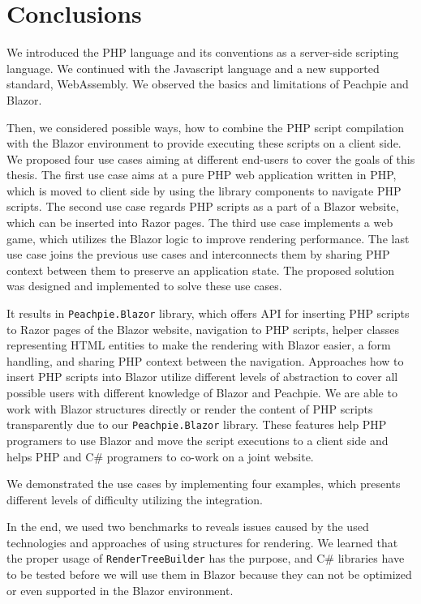 \chapter{Conclusions}

We introduced the PHP language and its conventions as a server-side scripting language.
We continued with the Javascript language and a new supported standard, WebAssembly.
We observed the basics and limitations of Peachpie and Blazor.
\par
Then, we considered possible ways, how to combine the PHP script compilation with the Blazor environment to provide executing these scripts on a client side.
We proposed four use cases aiming at different end-users to cover the goals of this thesis.
The first use case aims at a pure PHP web application written in PHP, which is moved to client side by using the library components to navigate PHP scripts.
The second use case regards PHP scripts as a part of a Blazor website, which can be inserted into Razor pages.
The third use case implements a web game, which utilizes the Blazor logic to improve rendering performance.
The last use case joins the previous use cases and interconnects them by sharing PHP context between them to preserve an application state.  
The proposed solution was designed and implemented to solve these use cases.
\par
It results in \texttt{Peachpie.Blazor} library, which offers API for inserting PHP scripts to Razor pages of the Blazor website, navigation to PHP scripts, helper classes representing HTML entities to make the rendering with Blazor easier, a form handling, and sharing PHP context between the navigation.
Approaches how to insert PHP scripts into Blazor utilize different levels of abstraction to cover all possible users with different knowledge of Blazor and Peachpie.
We are able to work with Blazor structures directly or render the content of PHP scripts transparently due to our \texttt{Peachpie.Blazor} library.
These features help PHP programers to use Blazor and move the script executions to a client side and helps PHP and C\# programers to co-work on a joint website.
\par
We demonstrated the use cases by implementing four examples, which presents different levels of difficulty utilizing the integration.
\par
In the end, we used two benchmarks to reveals issues caused by the used technologies and approaches of using structures for rendering.
We learned that the proper usage of \texttt{RenderTreeBuilder} has the purpose, and C\# libraries have to be tested before we will use them in Blazor because they can not be optimized or even supported in the Blazor environment.

